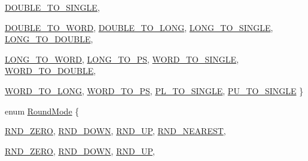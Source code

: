 \begin{DoxyCompactItemize}
\hyperlink{namespaceMipsISA_a3eb2ef7126c12e67d97d307c7aaa381da809b874bf53fbd75995de5ea882e7d35}{DOUBLE\_\-TO\_\-SINGLE}, 
\par
\hyperlink{namespaceMipsISA_a3eb2ef7126c12e67d97d307c7aaa381dab0ac7a82a5700c458940d17816eb973b}{DOUBLE\_\-TO\_\-WORD}, 
\hyperlink{namespaceMipsISA_a3eb2ef7126c12e67d97d307c7aaa381da5e484ee7a59e7d6b054b12c742225665}{DOUBLE\_\-TO\_\-LONG}, 
\hyperlink{namespaceMipsISA_a3eb2ef7126c12e67d97d307c7aaa381da1deb8bbd76b01b2a0c68b23530ed2759}{LONG\_\-TO\_\-SINGLE}, 
\hyperlink{namespaceMipsISA_a3eb2ef7126c12e67d97d307c7aaa381da8f615b4003b99b6950e2cc48cf111c0f}{LONG\_\-TO\_\-DOUBLE}, 
\par
\hyperlink{namespaceMipsISA_a3eb2ef7126c12e67d97d307c7aaa381dae357946a1de8a0bbc7a82f1865768d8b}{LONG\_\-TO\_\-WORD}, 
\hyperlink{namespaceMipsISA_a3eb2ef7126c12e67d97d307c7aaa381da9551359c12029e5ae13eb7b83c948a0c}{LONG\_\-TO\_\-PS}, 
\hyperlink{namespaceMipsISA_a3eb2ef7126c12e67d97d307c7aaa381da8cc01247620be34987688d5c077e127f}{WORD\_\-TO\_\-SINGLE}, 
\hyperlink{namespaceMipsISA_a3eb2ef7126c12e67d97d307c7aaa381da8679fcc29997d3828b41aabf45575fe7}{WORD\_\-TO\_\-DOUBLE}, 
\par
\hyperlink{namespaceMipsISA_a3eb2ef7126c12e67d97d307c7aaa381da9aa0d2d62dcb8e62e0c284edb6893948}{WORD\_\-TO\_\-LONG}, 
\hyperlink{namespaceMipsISA_a3eb2ef7126c12e67d97d307c7aaa381daf532ef4dd1b95ed83ce611e6bbf24013}{WORD\_\-TO\_\-PS}, 
\hyperlink{namespaceMipsISA_a3eb2ef7126c12e67d97d307c7aaa381da9ae2e17dbe7603259fa4fe91fa26a5bd}{PL\_\-TO\_\-SINGLE}, 
\hyperlink{namespaceMipsISA_a3eb2ef7126c12e67d97d307c7aaa381da6352b1d55a1ed6f3abff04f0002f32a0}{PU\_\-TO\_\-SINGLE}
 \}
\item 
enum \hyperlink{namespaceMipsISA_aa1e4b1e2e1e9c0f9c77041f40799a170}{RoundMode} \{ \par
\hyperlink{namespaceMipsISA_aa1e4b1e2e1e9c0f9c77041f40799a170a2c061d36a0a6cd518ca477c4004cf62b}{RND\_\-ZERO}, 
\hyperlink{namespaceMipsISA_aa1e4b1e2e1e9c0f9c77041f40799a170a82191a75e49c7a1814545251b7f470a3}{RND\_\-DOWN}, 
\hyperlink{namespaceMipsISA_aa1e4b1e2e1e9c0f9c77041f40799a170a7af0c2d4d38e881c6835e0bb52edcd39}{RND\_\-UP}, 
\hyperlink{namespaceMipsISA_aa1e4b1e2e1e9c0f9c77041f40799a170aaab1d0a67b8b7f129c7bf4d3165a9fe2}{RND\_\-NEAREST}, 
\par
\hyperlink{namespaceMipsISA_aa1e4b1e2e1e9c0f9c77041f40799a170a2c061d36a0a6cd518ca477c4004cf62b}{RND\_\-ZERO}, 
\hyperlink{namespaceMipsISA_aa1e4b1e2e1e9c0f9c77041f40799a170a82191a75e49c7a1814545251b7f470a3}{RND\_\-DOWN}, 
\hyperlink{namespaceMipsISA_aa1e4b1e2e1e9c0f9c77041f40799a170a7af0c2d4d38e881c6835e0bb52edcd39}{RND\_\-UP}, 

\end{DoxyCompactItemize}
